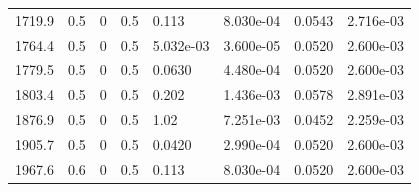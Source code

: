 \documentclass[preview]{standalone}
\begin{document}
{{\begin{tabular}{L{1.2cm}C{1.2cm} C{0.3cm}C{0.5cm} C{1.4cm}C{1.4cm} C{1.4cm}C{1.4cm}}
  1719.9  &   0.5  & 0     & 0.5 &  0.113  & 8.030e-04  & 0.0543 &  2.716e-03   \\ 
  1764.4  &   0.5  & 0     & 0.5 &  5.032e-03  & 3.600e-05  & 0.0520 &  2.600e-03   \\ 
  1779.5  &   0.5  & 0     & 0.5 &  0.0630  & 4.480e-04  & 0.0520 &  2.600e-03   \\ 
  1803.4  &   0.5  & 0     & 0.5 &  0.202  & 1.436e-03  & 0.0578 &  2.891e-03   \\ 
  1876.9  &   0.5  & 0     & 0.5 &  1.02  & 7.251e-03  & 0.0452 &  2.259e-03   \\ 
  1905.7  &   0.5  & 0     & 0.5 &  0.0420  & 2.990e-04  & 0.0520 &  2.600e-03   \\ 
  1967.6  &   0.6  & 0     & 0.5 &  0.113  & 8.030e-04  & 0.0520 &  2.600e-03   \\ 
\hline 
\end{tabular} 

}}
\end{document}
